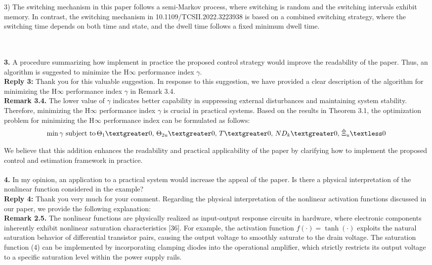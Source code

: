 \documentclass[14pt,fleqn]{article}
\begin{document}
3) The switching mechanism in this paper follows a semi-Markov process, where switching is random and the switching intervals exhibit memory. In contrast, the switching mechanism in 10.1109/TCSII.2022.3223938 is based on a combined switching strategy, where the switching time depends on both time and state, and the dwell time follows a fixed minimum dwell time.

~\\
\\
\textbf{3.} A procedure summarizing how implement in practice the proposed control strategy would improve the readability of the paper. Thus, an algorithm is suggested to minimize the H$\infty$ performance index $\gamma$.
\\[10pt]
\indent \textbf{Reply 3:} Thank you for this valuable suggestion. In response to this suggestion, we have provided a clear description of the algorithm for minimizing the H$\infty$ performance index $\gamma$ in Remark 3.4.\\

\textbf{Remark 3.4.}  {\color{red} The lower value of $\gamma$ indicates better capability in suppressing external disturbances and maintaining system stability. Therefore, minimizing the H$\infty$ performance index $\gamma$ is crucial in practical systems. Based on the results in Theorem 3.1, the optimization problem for minimizing the H$\infty$ performance index can be formulated as follows:
\begin{align*}
	\min \gamma \ \text{subject to} \, \Theta_{1}\textgreater 0,\, \Theta_{2u} \textgreater 0,\,  T \textgreater 0,\,  N D_k \textgreater 0, \, \hat{\Xi}_u  \textless 0
\end{align*}}

We believe that this addition enhances the readability and practical applicability of the paper by clarifying how to implement the proposed control and estimation framework in practice.
~\\
\\
\textbf{4.} In my opinion, an application to a practical system would increase the appeal of the paper. Is there a physical interpretation of the nonlinear function considered in the example?
\\[10pt]
\indent \textbf{Reply 4:} Thank you very much for your comment.  Regarding the physical interpretation of the nonlinear activation functions discussed in our paper, we provide the following explanation:\\

\textbf{Remark 2.5.}  {\color{red}The nonlinear functions are physically realized as input-output response circuits in hardware, where electronic components inherently exhibit nonlinear saturation characteristics [36]. For example, the activation function $f(\cdot)=\tanh(\cdot)$ exploits the natural saturation behavior of differential transistor pairs, causing the output voltage to smoothly saturate to the drain voltage. The saturation function (4) can be implemented by incorporating clamping diodes into the operational amplifier, which strictly restricts its output voltage to a specific saturation level within the power supply rails.}\\
\end{document}
